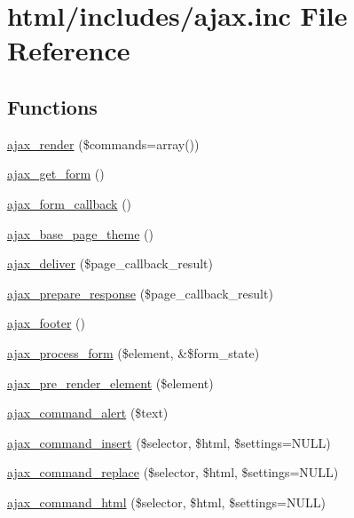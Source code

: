 \hypertarget{includes_2ajax_8inc}{
\section{html/includes/ajax.inc File Reference}
\label{includes_2ajax_8inc}
}
\subsection*{Functions}
\begin{DoxyCompactItemize}
\item 
\hyperlink{group__ajax_ga241c2426bdde049c55b05b7bf5d714a2}{ajax\_\-render} (\$commands=array())
\item 
\hyperlink{group__ajax_ga9bc57ec64df41b20fd92b21fe8c1e6b0}{ajax\_\-get\_\-form} ()
\item 
\hyperlink{group__ajax_gabe2739824006df057d291f6be49759ab}{ajax\_\-form\_\-callback} ()
\item 
\hyperlink{group__ajax_ga9d02bfeb3c0e9c3aa36c7f7645a042eb}{ajax\_\-base\_\-page\_\-theme} ()
\item 
\hyperlink{group__ajax_ga44a56b3660e97b39f87535a9a2bc8d8a}{ajax\_\-deliver} (\$page\_\-callback\_\-result)
\item 
\hyperlink{group__ajax_ga1dc07e6b41b955efdf29c2e7bf0aecdd}{ajax\_\-prepare\_\-response} (\$page\_\-callback\_\-result)
\item 
\hyperlink{group__ajax_ga6994db099f28d8e2d51218813e730834}{ajax\_\-footer} ()
\item 
\hyperlink{group__ajax_ga41a006b5f6d97e6e56e542f68fbc340d}{ajax\_\-process\_\-form} (\$element, \&\$form\_\-state)
\item 
\hyperlink{group__ajax_ga028d2f2b6b3875d91ea6cc88b19f237b}{ajax\_\-pre\_\-render\_\-element} (\$element)
\item 
\hyperlink{group__ajax__commands_gae4fdd3ece45cf6469c7492f16219b337}{ajax\_\-command\_\-alert} (\$text)
\item 
\hyperlink{group__ajax__commands_ga6c3bb9fd1958e286e6e1330c182952a1}{ajax\_\-command\_\-insert} (\$selector, \$html, \$settings=NULL)
\item 
\hyperlink{group__ajax__commands_ga558989ae457ca293bfb8ea19070ed334}{ajax\_\-command\_\-replace} (\$selector, \$html, \$settings=NULL)
\item 
\hyperlink{group__ajax__commands_ga37b14987e96029b64247d750a5d4ed79}{ajax\_\-command\_\-html} (\$selector, \$html, \$settings=NULL)
\item 

\end{DoxyCompactItemize}
